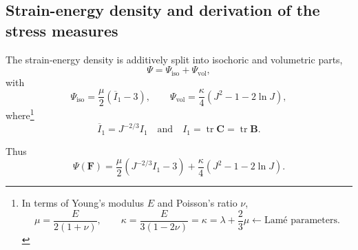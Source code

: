 \documentclass[11pt,a4paper]{article}
\newcommand{\tr}{\operatorname{tr}}
\begin{document}
\subsection{Strain-energy density and derivation of the stress measures}

The strain-energy density is additively split into isochoric and volumetric parts,
%
\begin{equation}
\Psi=\Psi_{\text{iso}}+\Psi_{\text{vol}},
\end{equation}
%
with
%
\begin{equation}
\Psi_{\text{iso}}
=\dfrac{\mu}{2}(\overline I_1-3),
\qquad
\Psi_{\text{vol}}
=\dfrac{\kappa}{4}\left(J^2-1-2\ln J\right),
\end{equation}
%
where\footnote{In terms of Young's modulus $E$ and Poisson's ratio $\nu$,
$$
\mu=\dfrac{E}{2(1+\nu)},
\qquad
\kappa=\dfrac{E}{3(1-2\nu)}=\kappa=\lambda+\dfrac23\mu\longleftarrow \text{Lam\'e parameters}.
$$
}
%
\begin{equation}
\overline I_1=J^{-2/3}I_1\quad\text{and}\quad I_1=\tr\textbf{C}=\tr\textbf{B}.
\end{equation}

Thus
%
\begin{equation}\label{eq_energy}
\Psi(\textbf{F})
=\dfrac{\mu}{2}\left(J^{-2/3}I_1-3\right)
+\dfrac{\kappa}{4}\left(J^2-1-2\ln J\right).
\end{equation}
%
\end{document}
